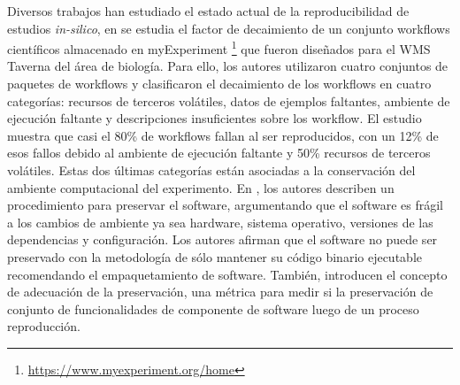 Diversos trabajos han estudiado el estado actual de la reproducibilidad de estudios \emph{in-silico}, en \cite{DBLP:conf/eScience/ZhaoGBKGGHRRG12} se estudia el factor de decaimiento de un conjunto workflows científicos almacenado en myExperiment \footnote{\url{https://www.myexperiment.org/home}} que fueron diseñados para el WMS Taverna \cite{DBLP:journals/bioinformatics/OinnAFMSGCGPWL04} del área de biología. Para ello, los autores utilizaron cuatro conjuntos de paquetes de workflows y clasificaron el decaimiento de los workflows en cuatro categorías: recursos de terceros volátiles, datos de ejemplos faltantes, ambiente de ejecución faltante y descripciones insuficientes sobre los workflow. El estudio muestra que casi el 80\% de workflows fallan al ser reproducidos, con un 12\% de esos fallos debido al ambiente de ejecución faltante y 50\% recursos de terceros volátiles. Estas dos últimas categorías están asociadas a la conservación del ambiente computacional del experimento.
En \cite{DBLP:conf/ipres/MatthewsCWJBS09}, los autores describen un procedimiento para preservar el software, argumentando que el software es frágil a los cambios de ambiente ya sea hardware, sistema operativo, versiones de las dependencias y configuración. Los autores afirman que el software no puede ser preservado con la metodología de sólo mantener su código binario ejecutable recomendando el empaquetamiento de software. También, introducen el concepto de adecuación de la preservación, una métrica para medir si la preservación de conjunto de funcionalidades de componente de software luego de un proceso reproducción.

